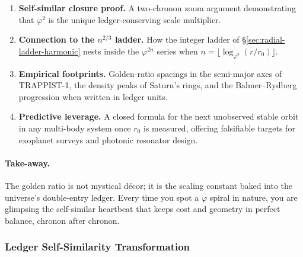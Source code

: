 \documentclass[11pt,oneside]{book}
\begin{document}
\begin{enumerate}[label=\arabic*.,leftmargin=*,itemsep=3pt]
\item \textbf{Self-similar closure proof.}  
      A two-chronon zoom argument demonstrating that $\varphi^{2}$ is
      the unique ledger-conserving scale multiplier.
\item \textbf{Connection to the $n^{2/3}$ ladder.}  
      How the integer ladder of §\ref{sec:radial-ladder-harmonic} nests
      inside the $\varphi^{2n}$ series when $n=\lfloor\log_{\varphi^{2}}
      (r/r_{0})\rfloor$.
\item \textbf{Empirical footprints.}  
      Golden-ratio spacings in the semi-major axes of TRAPPIST-1,
      the density peaks of Saturn’s rings, and the Balmer–Rydberg
      progression when written in ledger units.
\item \textbf{Predictive leverage.}  
      A closed formula for the next unobserved stable orbit in any
      multi-body system once $r_{0}$ is measured, offering
      falsifiable targets for exoplanet surveys and photonic
      resonator design.
\end{enumerate}

\paragraph{Take-away.}
The golden ratio is not mystical décor; it is the scaling constant
baked into the universe’s double-entry ledger.  
Every time you spot a $\varphi$ spiral in nature, you are glimpsing
the self-similar heartbeat that keeps cost and geometry in perfect
balance, chronon after chronon.


\subsubsection{Ledger Self-Similarity Transformation}
\label{ss:phi2-zoom}
\end{document}
